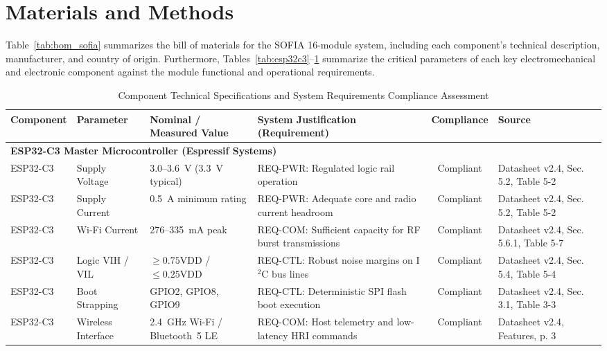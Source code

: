 \documentclass[lettersize,journal]{IEEEtran}
\begin{document}
	\section{Materials and Methods}
	\label{sec:methods}
	
	Table~\ref{tab:bom_sofia} summarizes the bill of materials for the SOFIA 16-module system, including each component's technical description, manufacturer, and country of origin. Furthermore, Tables~\ref{tab:esp32c3}--\ref{tab:PCA9685} summarize the critical parameters of each key electromechanical and electronic component against the module functional and operational requirements.
	
	
	\begin{table}[!t]
		\centering
		\caption{Component Technical Specifications and System Requirements Compliance Assessment}
		\label{tab:compliance}
		\label{tab:esp32c3}\label{tab:MG90s}\label{tab:PCA9685}
		\scriptsize
		\renewcommand{\arraystretch}{1.04}
		\begin{tabular}{p{2.2cm} p{2.8cm} p{3.0cm} p{3.8cm} c p{3.4cm}}
			\toprule
			\textbf{Component} & \textbf{Parameter} & \textbf{Nominal / Measured Value} & \textbf{System Justification (Requirement)} & \textbf{Compliance} & \textbf{Source} \\
			\midrule
			\multicolumn{6}{l}{\textbf{ESP32-C3 Master Microcontroller (Espressif Systems)}} \\
			ESP32-C3 & Supply Voltage & 3.0--3.6~V (3.3~V typical) & REQ-PWR: Regulated logic rail operation & Compliant & Datasheet v2.4, Sec. 5.2, Table 5-2 \\
			ESP32-C3 & Supply Current & 0.5~A minimum rating & REQ-PWR: Adequate core and radio current headroom & Compliant & Datasheet v2.4, Sec. 5.2, Table 5-2 \\
			ESP32-C3 & Wi-Fi Current & 276--335~mA peak & REQ-COM: Sufficient capacity for RF burst transmissions & Compliant & Datasheet v2.4, Sec. 5.6.1, Table 5-7 \\
			ESP32-C3 & Logic VIH / VIL & $\ge 0.75\text{VDD}$ / $\le 0.25\text{VDD}$ & REQ-CTL: Robust noise margins on I$^2$C bus lines & Compliant & Datasheet v2.4, Sec. 5.4, Table 5-4 \\
			ESP32-C3 & Boot Strapping & GPIO2, GPIO8, GPIO9 & REQ-CTL: Deterministic SPI flash boot execution & Compliant & Datasheet v2.4, Sec. 3.1, Table 3-3 \\
			ESP32-C3 & Wireless Interface & 2.4~GHz Wi-Fi / Bluetooth~5 LE & REQ-COM: Host telemetry and low-latency HRI commands & Compliant & Datasheet v2.4, Features, p. 3 \\

\end{tabular}
\end{table}
\end{document}
